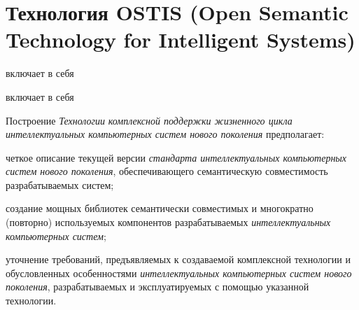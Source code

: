 \section{Технология OSTIS (Open Semantic Technology for Intelligent Systems)}
\label{sec_ostis_tech}

\begin{SCn}
\begin{scnrelfromlistcustom}{включает в себя}
	\begin{scnindent}
		\begin{scnrelfromlistcustom}{включает в себя}
		\end{scnrelfromlistcustom}
	\end{scnindent}
\end{scnrelfromlistcustom}
\end{SCn}

Построение \textit{Технологии} \textit{комплексной поддержки жизненного цикла интеллектуальных компьютерных систем нового поколения} предполагает:

\begin{textitemize}
	\item четкое описание текущей версии \textit{стандарта интеллектуальных компьютерных систем нового поколения}, обеспечивающего семантическую совместимость разрабатываемых систем;
	\item создание мощных библиотек семантически совместимых и многократно (повторно) используемых компонентов разрабатываемых \textit{интеллектуальных компьютерных систем};
	\item уточнение требований, предъявляемых к создаваемой комплексной технологии и обусловленных особенностями \textit{интеллектуальных компьютерных систем нового поколения}, разрабатываемых и эксплуатируемых с помощью указанной технологии.
\end{textitemize}

